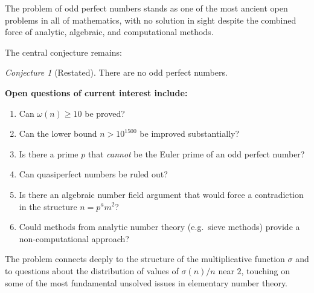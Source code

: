 \documentclass[12pt,a4paper]{amsart}
\theoremstyle{definition}
\theoremstyle{remark}
\newtheorem{conjecture}[theorem]{Conjecture}
\begin{document}
The problem of odd perfect numbers stands as one of the most ancient open
problems in all of mathematics, with no solution in sight despite the
combined force of analytic, algebraic, and computational methods.

The central conjecture remains:

\begin{conjecture}[Restated]
There are no odd perfect numbers.
\end{conjecture}

\noindent\textbf{Open questions of current interest include:}
\begin{enumerate}[label=(\arabic*)]
  \item Can $\omega(n) \geq 10$ be proved?
  \item Can the lower bound $n > 10^{1500}$ be improved substantially?
  \item Is there a prime $p$ that \emph{cannot} be the Euler prime of an odd
        perfect number?
  \item Can quasiperfect numbers be ruled out?
  \item Is there an algebraic number field argument that would force a
        contradiction in the structure $n = p^a m^2$?
  \item Could methods from analytic number theory (e.g.\ sieve methods) provide
        a non-computational approach?
\end{enumerate}

The problem connects deeply to the structure of the multiplicative function
$\sigma$ and to questions about the distribution of values of $\sigma(n)/n$
near $2$, touching on some of the most fundamental unsolved issues in
elementary number theory.
\end{document}
